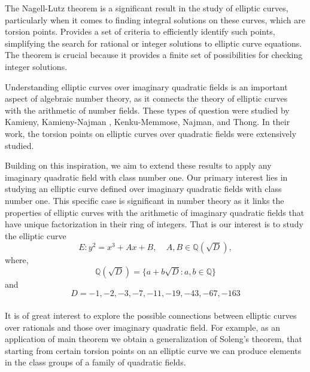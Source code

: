 \documentclass[12pt,leqno]{amsart}
\newcommand{\<}{\langle}
\renewcommand{\>}{\rangle}
\theoremstyle{definition}
\numberwithin{equation}{section}
\begin{document}
\smallskip

The Nagell-Lutz theorem is a significant result in the study of elliptic curves, particularly when it comes to finding integral solutions on these curves, which are torsion points. Provides a set of criteria to efficiently identify such points, simplifying the search for rational or integer solutions to elliptic curve equations. The theorem is crucial because it provides a finite set of possibilities for checking integer solutions.

\smallskip
 Understanding elliptic curves over imaginary quadratic fields is an important aspect of algebraic number theory, as it connects the theory of elliptic curves with the arithmetic of number fields. These types of question were studied by Kamieny\cite{K}, Kamieny-Najman \cite{KM}, Kenku-Memmose\cite{KM}, Najman\cite{N},\cite{N1} and Thong\cite{T}. In their work,  the  torsion points on elliptic curves over quadratic fields were extensively studied.
 
 Building on this inspiration, we aim to extend these results to apply any imaginary quadratic field with class number one.  Our primary interest lies in studying an elliptic curve defined over imaginary quadratic fields with class number one. This specific case is significant in number theory as it links the properties of elliptic curves with the arithmetic of imaginary quadratic fields that have unique factorization in their ring of integers. That is our interest is to study the elliptic curve
\begin{equation*}
    E:y^2=x^3+Ax+B,~~~~~A,B\in \mathbb Q(\sqrt{D}),
\end{equation*}
where, $$\mathbb Q(\sqrt{D})=\{a+b\sqrt{D}:a,b\in \mathbb Q\}$$ and $$D=-1, -2, -3, -7, -11, -19, -43, -67, -163$$\\
It is of great interest to explore the possible connections between elliptic curves over rationals and those over imaginary quadratic field. For example, as an application of main theorem we obtain a generalization of Soleng's \cite{S} theorem, that starting from certain torsion points on an elliptic curve we can produce elements in the class groups of a family of quadratic fields.
\end{document}
